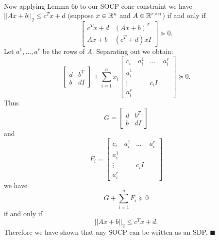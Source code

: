 \documentclass[letterpaper,12pt,oneside,onecolumn]{article}
\begin{document}
\paragraph{}
Now applying Lemma $6b$ to our SOCP cone constraint we have $||Ax +b||_2 \leq c^Tx + d$ (suppose $x\in\mathbb{R}^n$ and $A \in \mathbb{R}^{r\times n}$) if and only if
$$\begin{bmatrix} c^Tx + d & (Ax+b)^T \\ Ax + b &(c^T+d)xI \end{bmatrix} \succcurlyeq 0.$$
Let $a^1, \dots, a^r$ be the rows of $A$. Separating out we obtain:
$$\begin{bmatrix} d & b^T \\ b & dI \end{bmatrix} + \sum_{i=1}^n x_i \begin{bmatrix} c_i & a^1_i & \dots & a^r_i \\ a^1_i \\ \vdots & &c_iI\\ a^r_i \end{bmatrix} \succcurlyeq 0.$$
Thus $$G = \begin{bmatrix} d & b^T \\ b & dI \end{bmatrix}$$
and 
$$F_i = \begin{bmatrix} c_i & a^1_i & \dots & a^r_i \\ a^1_i \\ \vdots & &c_iI\\ a^r_i \end{bmatrix}$$
we have
$$G + \sum_{i=1}^n F_i \succcurlyeq 0$$
if and only if
$$||Ax+b||_2 \leq c^Tx + d.$$
Therefore we have shown that any SOCP can be written as an SDP. $\blacksquare$
\end{document}
